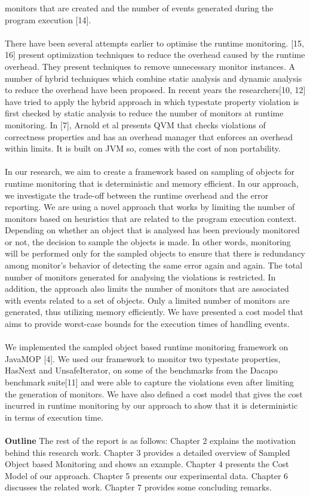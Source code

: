 {monitors that are created and the number of events generated during the program 
execution [14].\\\\
There have been several attempts earlier to optimise the runtime monitoring. 
[15, 16] present optimization techniques to reduce the overhead caused by the 
runtime overhead. They present techniques to remove unnecessary monitor 
instances. A number of hybrid techniques which combine static analysis and 
dynamic analysis to reduce the overhead have been proposed. In recent years the 
researchers[10, 12] have tried to apply the hybrid approach in which typestate 
property violation is first checked by static analysis to reduce the number of 
monitors at runtime monitoring. In [7], Arnold et al presents QVM that checks 
violations of correctness properties and has an overhead manager that enforces 
an overhead within limits. It is built on JVM so, comes with the cost of non 
portability.\\\\ 
In our research, we aim to create a framework based on sampling of objects for 
runtime monitoring that is deterministic and memory efficient. In our approach, 
we investigate the trade-off between the runtime overhead and the error 
reporting.  We are using a novel approach that works by limiting the number of 
monitors based on heuristics that are related to the program execution context. 
Depending on whether an object that is analysed has been previously monitored or 
not, the decision to sample the objects is made. In other words, monitoring will 
be performed only for the sampled objects to ensure that there is  redundancy 
among monitor's behavior of detecting the same error again and again. The total 
number of monitors generated for analysing the violations is restricted. In 
addition, the approach also limits the number of monitors that are associated 
with events related to a set of objects. Only a limited number of monitors are 
generated, thus utilizing memory efficiently. We have presented a cost model 
that aims to provide worst-case bounds for the execution times of handling 
events.\\\\
We implemented the sampled object based runtime monitoring framework on JavaMOP 
[4]. We used our framework to monitor two typestate properties, HasNext and 
UnsafeIterator, on some of the benchmarks from the Dacapo benchmark suite[11] 
and were able to capture the violations even after limiting the generation of 
monitors. We have also defined a cost model that gives the cost incurred in 
runtime monitoring by our approach to show that it is deterministic in terms of 
execution time.\\\\
\textbf{Outline} The rest of the report is as follows: Chapter 2 explains the 
motivation behind this research work. Chapter 3 provides a detailed overview of 
Sampled Object based Monitoring and shows an example. Chapter 4 presents the 
Cost Model of our approach. Chapter 5 presents our experimental data. Chapter 6 
discusses the related work. Chapter 7 provides some concluding remarks.
}




